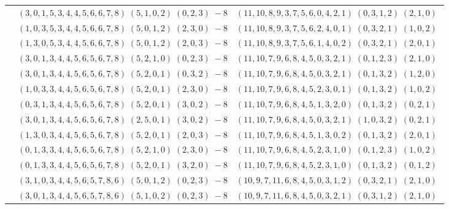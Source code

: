 \documentclass[11pt]{article}
\begin{document}
\begin{longtable}[l]{|c|c|c|}
 \cline{2-3} 
 & $(3 ,0 ,1 ,5 ,3 ,4 ,4 ,5 ,6 ,6 ,7 ,8) \;(5 ,1 ,0 ,2) \;(0 ,2 ,3) \;-8$ & $(11 ,10 ,8 ,9 ,3 ,7 ,5 ,6 ,0 ,4 ,2 ,1) \;(0 ,3 ,1 ,2) \;(2 ,1 ,0) \;$\\ 
 \cline{2-3} 
 & $(1 ,0 ,3 ,5 ,3 ,4 ,4 ,5 ,6 ,6 ,7 ,8) \;(5 ,0 ,1 ,2) \;(2 ,3 ,0) \;-8$ & $(11 ,10 ,8 ,9 ,3 ,7 ,5 ,6 ,2 ,4 ,0 ,1) \;(0 ,3 ,2 ,1) \;(1 ,0 ,2) \;$\\ 
 \cline{2-3} 
 & $(1 ,3 ,0 ,5 ,3 ,4 ,4 ,5 ,6 ,6 ,7 ,8) \;(5 ,0 ,1 ,2) \;(2 ,0 ,3) \;-8$ & $(11 ,10 ,8 ,9 ,3 ,7 ,5 ,6 ,1 ,4 ,0 ,2) \;(0 ,3 ,2 ,1) \;(2 ,0 ,1) \;$\\ 
 \cline{2-3} 
 & $(3 ,0 ,1 ,3 ,4 ,4 ,5 ,6 ,5 ,6 ,7 ,8) \;(5 ,2 ,1 ,0) \;(0 ,2 ,3) \;-8$ & $(11 ,10 ,7 ,9 ,6 ,8 ,4 ,5 ,0 ,3 ,2 ,1) \;(0 ,1 ,2 ,3) \;(2 ,1 ,0) \;$\\ 
 \cline{2-3} 
 & $(3 ,0 ,1 ,3 ,4 ,4 ,5 ,6 ,5 ,6 ,7 ,8) \;(5 ,2 ,0 ,1) \;(0 ,3 ,2) \;-8$ & $(11 ,10 ,7 ,9 ,6 ,8 ,4 ,5 ,0 ,3 ,2 ,1) \;(0 ,1 ,3 ,2) \;(1 ,2 ,0) \;$\\ 
 \cline{2-3} 
 & $(1 ,0 ,3 ,3 ,4 ,4 ,5 ,6 ,5 ,6 ,7 ,8) \;(5 ,2 ,0 ,1) \;(2 ,3 ,0) \;-8$ & $(11 ,10 ,7 ,9 ,6 ,8 ,4 ,5 ,2 ,3 ,0 ,1) \;(0 ,1 ,3 ,2) \;(1 ,0 ,2) \;$\\ 
 \cline{2-3} 
 & $(0 ,3 ,1 ,3 ,4 ,4 ,5 ,6 ,5 ,6 ,7 ,8) \;(5 ,2 ,0 ,1) \;(3 ,0 ,2) \;-8$ & $(11 ,10 ,7 ,9 ,6 ,8 ,4 ,5 ,1 ,3 ,2 ,0) \;(0 ,1 ,3 ,2) \;(0 ,2 ,1) \;$\\ 
 \cline{2-3} 
 & $(3 ,0 ,1 ,3 ,4 ,4 ,5 ,6 ,5 ,6 ,7 ,8) \;(2 ,5 ,0 ,1) \;(3 ,0 ,2) \;-8$ & $(11 ,10 ,7 ,9 ,6 ,8 ,4 ,5 ,0 ,3 ,2 ,1) \;(1 ,0 ,3 ,2) \;(0 ,2 ,1) \;$\\ 
 \cline{2-3} 
 & $(1 ,3 ,0 ,3 ,4 ,4 ,5 ,6 ,5 ,6 ,7 ,8) \;(5 ,2 ,0 ,1) \;(2 ,0 ,3) \;-8$ & $(11 ,10 ,7 ,9 ,6 ,8 ,4 ,5 ,1 ,3 ,0 ,2) \;(0 ,1 ,3 ,2) \;(2 ,0 ,1) \;$\\ 
 \cline{2-3} 
 & $(0 ,1 ,3 ,3 ,4 ,4 ,5 ,6 ,5 ,6 ,7 ,8) \;(5 ,2 ,1 ,0) \;(2 ,3 ,0) \;-8$ & $(11 ,10 ,7 ,9 ,6 ,8 ,4 ,5 ,2 ,3 ,1 ,0) \;(0 ,1 ,2 ,3) \;(1 ,0 ,2) \;$\\ 
 \cline{2-3} 
 & $(0 ,1 ,3 ,3 ,4 ,4 ,5 ,6 ,5 ,6 ,7 ,8) \;(5 ,2 ,0 ,1) \;(3 ,2 ,0) \;-8$ & $(11 ,10 ,7 ,9 ,6 ,8 ,4 ,5 ,2 ,3 ,1 ,0) \;(0 ,1 ,3 ,2) \;(0 ,1 ,2) \;$\\ 
 \cline{2-3} 
 & $(3 ,1 ,0 ,3 ,4 ,4 ,5 ,6 ,5 ,7 ,8 ,6) \;(5 ,0 ,1 ,2) \;(0 ,2 ,3) \;-8$ & $(10 ,9 ,7 ,11 ,6 ,8 ,4 ,5 ,0 ,3 ,1 ,2) \;(0 ,3 ,2 ,1) \;(2 ,1 ,0) \;$\\ 
 \cline{2-3} 
 & $(3 ,0 ,1 ,3 ,4 ,4 ,5 ,6 ,5 ,7 ,8 ,6) \;(5 ,1 ,0 ,2) \;(0 ,2 ,3) \;-8$ & $(10 ,9 ,7 ,11 ,6 ,8 ,4 ,5 ,0 ,3 ,2 ,1) \;(0 ,3 ,1 ,2) \;(2 ,1 ,0) \;$\\ 

\end{longtable}
\end{document}
